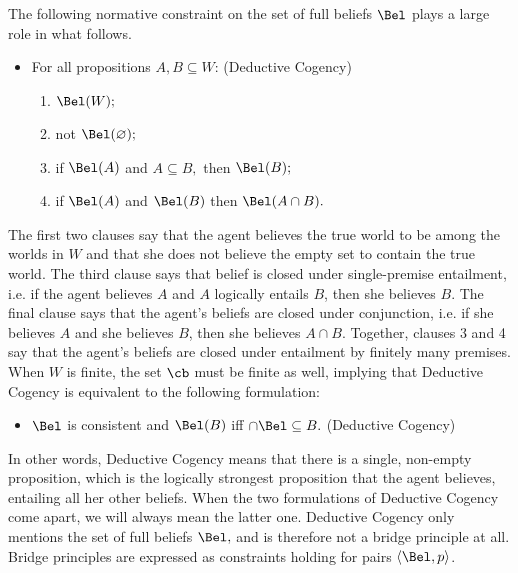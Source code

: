 The following normative constraint on the set of full beliefs $\Bel$ plays a
large role in what follows.
\begin{itemize}
\item[] For all propositions $A,B \subseteq W$: \hfill(Deductive Cogency)
  \begin{enumerate}
  \item $\Bel(W);$
  \item not $\Bel(\varnothing);$
  \item if $\Bel(A)$ and $A\subseteq B,$ then $\Bel(B);$
  \item if $\Bel(A)$ and $\Bel(B)$ then $\Bel(A\cap B).$
  \end{enumerate}
\end{itemize}
The first two clauses say that the agent believes the true world to be among the
worlds in $W$ and that she does not believe the empty set to contain the true
world. The third clause says that belief is closed under single-premise
entailment, i.e. if the agent believes $A$ and $A$ logically entails $B$, then
she believes $B$. The final clause says that the agent's beliefs are closed
under conjunction, i.e. if she believes $A$ and she believes $B$, then she
believes $A\cap B.$ Together, clauses 3 and 4 say that the agent's beliefs are
closed under entailment by finitely many premises. When $W$ is finite, the set
$\cb$ must be finite as well, implying that Deductive Cogency is equivalent to
the following formulation:
\begin{itemize}
\item[] $\Bel$ is consistent and $\Bel(B)$ iff $\cap \Bel \subseteq B.$ \hfill
(Deductive Cogency)
\end{itemize}
In other words, Deductive Cogency means that there is a single, non-empty
proposition, which is the logically strongest proposition that the agent
believes,  entailing all her other beliefs. When the two formulations of
Deductive Cogency come apart, we will always mean the latter one. %
Deductive Cogency only mentions the set of full beliefs $\Bel,$ and is therefore
not a bridge principle at all. Bridge principles are expressed as constraints
holding for pairs $\langle \Bel,p \rangle$.   

